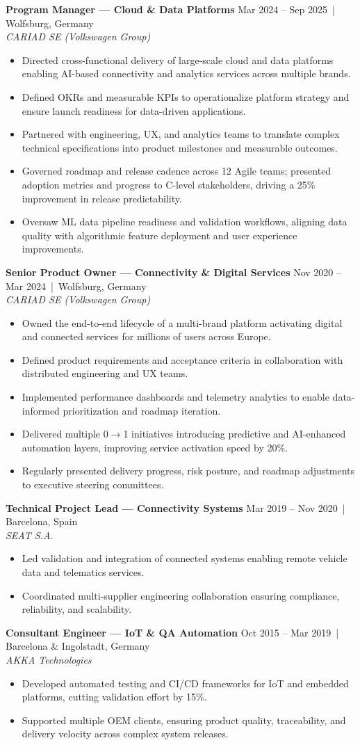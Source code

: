\documentclass[a4paper,12pt]{article}
\newcommand{\resumeItemListStart}{\begin{itemize}[topsep=0pt,itemsep=2pt]}
\newcommand{\resumeItemListEnd}{\end{itemize}\vspace{1pt}}
\newcommand{\resumeItem}[1]{\item\small{#1}}
\newcommand{\resumeSubheading}[4]{%
  \item
  \vspace{4pt}%
  \textbf{#1} \hfill {\small #2 \,|\, #3}\\[-1pt]
  \textit{\small #4}\vspace{1pt}%
}
\begin{document}
\resumeSubheading
  {Program Manager — Cloud \& Data Platforms}{Mar 2024 -- Sep 2025}{Wolfsburg, Germany}{CARIAD SE (Volkswagen Group)}
  \resumeItemListStart
    \resumeItem{Directed cross-functional delivery of large-scale cloud and data platforms enabling AI-based connectivity and analytics services across multiple brands.}
    \resumeItem{Defined OKRs and measurable KPIs to operationalize platform strategy and ensure launch readiness for data-driven applications.}
    \resumeItem{Partnered with engineering, UX, and analytics teams to translate complex technical specifications into product milestones and measurable outcomes.}
    \resumeItem{Governed roadmap and release cadence across 12 Agile teams; presented adoption metrics and progress to C-level stakeholders, driving a 25\% improvement in release predictability.}
    \resumeItem{Oversaw ML data pipeline readiness and validation workflows, aligning data quality with algorithmic feature deployment and user experience improvements.}
  \resumeItemListEnd

\resumeSubheading
  {Senior Product Owner — Connectivity \& Digital Services}{Nov 2020 -- Mar 2024}{Wolfsburg, Germany}{CARIAD SE (Volkswagen Group)}
  \resumeItemListStart
    \resumeItem{Owned the end-to-end lifecycle of a multi-brand platform activating digital and connected services for millions of users across Europe.}
    \resumeItem{Defined product requirements and acceptance criteria in collaboration with distributed engineering and UX teams.}
    \resumeItem{Implemented performance dashboards and telemetry analytics to enable data-informed prioritization and roadmap iteration.}
    \resumeItem{Delivered multiple 0$\rightarrow$1 initiatives introducing predictive and AI-enhanced automation layers, improving service activation speed by 20\%.}
    \resumeItem{Regularly presented delivery progress, risk posture, and roadmap adjustments to executive steering committees.}
  \resumeItemListEnd

\resumeSubheading
  {Technical Project Lead — Connectivity Systems}{Mar 2019 -- Nov 2020}{Barcelona, Spain}{SEAT S.A.}
  \resumeItemListStart
    \resumeItem{Led validation and integration of connected systems enabling remote vehicle data and telematics services.}
    \resumeItem{Coordinated multi-supplier engineering collaboration ensuring compliance, reliability, and scalability.}
  \resumeItemListEnd

\resumeSubheading
  {Consultant Engineer — IoT \& QA Automation}{Oct 2015 -- Mar 2019}{Barcelona \& Ingolstadt, Germany}{AKKA Technologies}
  \resumeItemListStart
    \resumeItem{Developed automated testing and CI/CD frameworks for IoT and embedded platforms, cutting validation effort by 15\%.}
    \resumeItem{Supported multiple OEM clients, ensuring product quality, traceability, and delivery velocity across complex system releases.}
  \resumeItemListEnd
\end{document}

